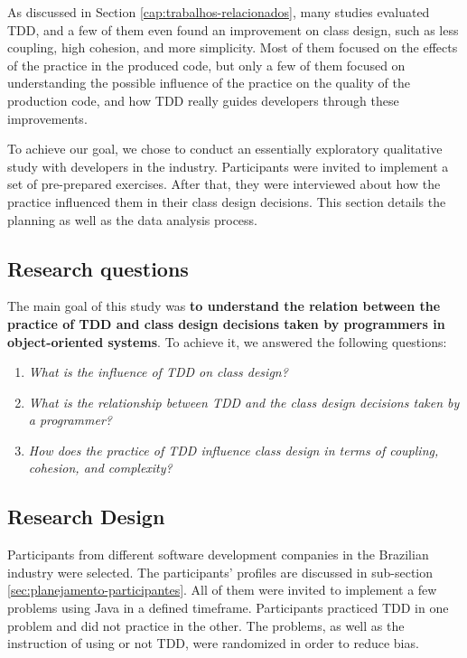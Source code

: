 \documentclass[times]{speauth}
\begin{document}
As discussed in Section \ref{cap:trabalhos-relacionados}, many studies evaluated
TDD, and a few of them even found an improvement on class design, such as
less coupling, high cohesion, and more simplicity. Most of them focused on
the effects of the practice in the produced code, but only a few of them focused on understanding
the possible influence of the practice on the quality of the production code, 
and how TDD really guides developers through these improvements.

To achieve our goal, we chose to conduct an essentially 
exploratory qualitative study with developers in the industry. Participants
were invited to implement a set of pre-prepared exercises. After that,
they were interviewed about how the practice influenced them in their
class design decisions. This section details the planning as well as
the data analysis process.


\subsection{Research questions}

The main goal of this study was \textbf{to understand the relation between
the practice of TDD and class design decisions taken by programmers in object-oriented
systems}. To achieve it, we answered the following questions:

\begin{enumerate}

	\item \textit{What is the influence of TDD on class design?}

	\item \textit{What is the relationship between TDD and the class design decisions taken
	by a programmer?}

	\item \textit{How does the practice of TDD influence class design in terms of coupling, 
	cohesion, and complexity?}

\end{enumerate}

\subsection{Research Design}

Participants from different software development companies in the Brazilian
industry were selected. The participants' profiles are discussed in sub-section
\ref{sec:planejamento-participantes}. All of them were invited to implement
a few problems using Java in a defined timeframe. Participants practiced
TDD in one problem and did not practice in the other. The problems,
as well as the instruction of using or not TDD, were
randomized in order to reduce bias.
\end{document}
